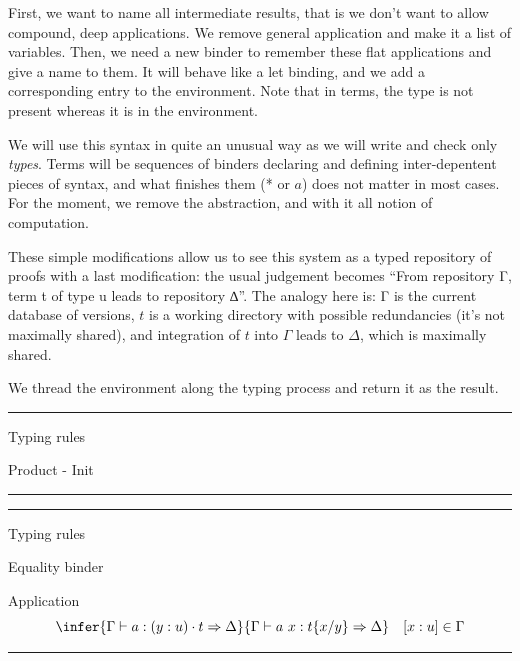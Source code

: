 \documentclass[ignorenonframetext,red]{beamer}
\begin{document}
First, we want to name all intermediate results, that is we don't want
to allow compound, deep applications. We remove general application
and make it a list of variables. Then, we need a new binder to
remember these flat applications and give a name to them. It will
behave like a \textsf{let} binding, and we add a corresponding entry
to the environment. Note that in terms, the type is not present
whereas it is in the environment.

We will use this syntax in quite an unusual way as we will write and
check only \emph{types}. Terms will be sequences of binders declaring
and defining inter-depentent pieces of syntax, and what finishes them
(* or $a$) does not matter in most cases. For the moment, we remove
the abstraction, and with it all notion of computation.

These simple modifications allow us to see this system as a typed
repository of proofs with a last modification: the usual judgement
becomes ``From repository Γ, term t of type u leads to repository
∆''. The analogy here is: Γ is the current database of versions, $t$
is a working directory with possible redundancies (it's not maximally
shared), and integration of $t$ into $\Gamma$ leads to $\Delta$, which
is maximally shared.

We thread the environment along the typing process and return it as
the result.

\hrule
\begin{frame}{Typing rules}
  \begin{block}{Product - Init}
  \end{block}
\end{frame}
\hrule

\hrule
\begin{frame}{Typing rules}
  \begin{block}{Equality binder}
  \end{block}
  \pause
  \begin{block}{Application}
    \[ \infer
      {\Gamma\vdash a : (y:u)\cdot t \Rightarrow\Delta}
      {\Gamma\vdash a\ x : t \{x/y\} \Rightarrow\Delta}
      \quad [x : u] \in \Gamma
      \]
  \end{block}
\end{frame}
\hrule
\end{document}
